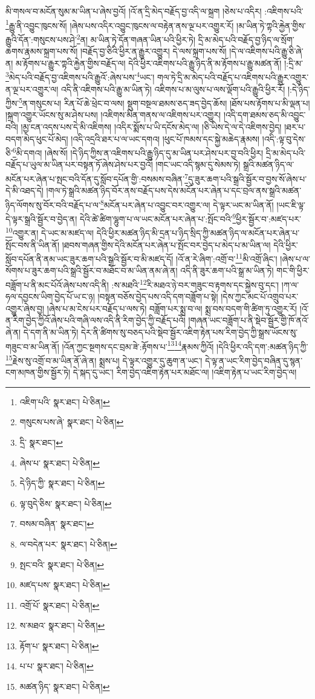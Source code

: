 མི་གསལ་བ་མངོན་སུམ་མ་ཡིན་པ་ཞེས་བྱའོ། །འོ་ན་དྲི་མེད་བརྗོད་བྱ་འདི་ལ་སྐྲག །ཅེས་པ་འདིར། :འཇིགས་པའི་\footnote{འཇིག་པའི་  སྣར་ཐང་།  པེ་ཅིན། }རྒྱུ་ནི་འབྱུང་ཁུངས་སོ། །ཞེས་པས་འདིར་འབྱུང་ཁུངས་ལ་བརྟེན་ནས་ལྔ་པར་འགྱུར་རོ། །མ་ཡིན་ཏེ་ཀྟའི་རྐྱེན་གྱིས་རྒྱུའི་དོན་:གསུངས་པས་ཤེ་\footnote{གསུངས་པས་ཞེ་  སྣར་ཐང་།  པེ་ཅིན། }ན། མ་ཡིན་ཏེ་དོན་གཞན་ཡིན་པའི་ཕྱིར་ཏེ། དྲི་མ་མེད་པའི་བརྗོད་བྱ་ཉིད་ལ་སྲོག་ཆགས་རྣམས་སྐྲག་པས་སོ། །བརྗོད་བྱ་ཅིའི་ཕྱིར་ན་རྒྱུར་འགྱུར། དེ་ལས་སྐྲག་པས་སོ། །དེ་ལ་འཇིགས་པའི་རྒྱུ་ཅི་ཞེ་ན། མ་རྟོགས་པ་རྒྱུར་ཀྟའི་རྐྱེན་གྱིས་བརྗོད་ལ། དེའི་ཕྱིར་འཇིགས་པའི་རྒྱུ་ཉིད་ནི་མ་རྟོགས་པ་རྒྱུ་མཚན་ནོ། །:དྲི་མ་\footnote{དྲི་  སྣར་ཐང་། }མེད་པའི་བརྗོད་བྱ་འཇིགས་པའི་རྒྱུའོ་:ཞེས་པས་\footnote{ཞེས་པ་  སྣར་ཐང་།  པེ་ཅིན། }ཡང་། གལ་ཏེ་དྲི་མ་མེད་པའི་བརྗོད་པ་འཇིགས་པའི་རྒྱུར་འགྱུར་ན་ལྔ་པར་འགྱུར་ལ། འདི་ནི་འཇིགས་པའི་རྒྱུ་མ་ཡིན་ཏེ། འཇིགས་པ་མ་ལུས་པ་ལས་ལྡོག་པའི་རྒྱུའི་ཕྱིར་རོ། །:དེ་ཉིད་ཀྱིས་\footnote{དེ་ཉིད་ཀྱི་  སྣར་ཐང་།  པེ་ཅིན། }ན་གསུངས་པ། རིན་པོ་ཆེ་ཕྲེང་བ་ལས། སྡུག་བསྔལ་ཐམས་ཅད་ཟད་བྱེད་ཆོས། །ཐོས་པས་རྟོགས་པ་མི་ལྡན་པ། །སྐྲག་འགྱུར་ཡོངས་སུ་མ་ཤེས་པས། །འཇིགས་མིན་གནས་ལ་འཇིགས་པར་འགྱུར། །འདི་དག་ཐམས་ཅད་མི་འབྱུང་བའི། །མྱ་ངན་འདས་པས་དེ་མི་འཇིགས། །འདིར་སྨོས་པ་ཡི་དངོས་མེད་ལ། །ཅི་ཡིས་དེ་ལ་དེ་འཇིགས་བྱེད། །ཐར་པ་བདག་མེད་ཕུང་པོ་མེད། །འདི་འདྲའི་ཐར་པ་ལ་ཡང་དགའ། །ཕུང་པོ་ཁམས་དང་སྐྱེ་མཆེད་རྣམས། །འདི་:ལྟ་བུ་དེས་ཅི་\footnote{ལྟ་བུདེ་ཅིས་  སྣར་ཐང་།  པེ་ཅིན། }མི་དགའ། །ཞེས་སོ། །དེ་ཉིད་ཀྱིས་ན་འཇིགས་པའི་རྒྱུ་ཉིད་དུ་མ་ཡིན་པར་ཤེས་པར་བྱ་བའི་ཕྱིར། དྲི་མ་མེད་པའི་བརྗོད་པ་ཡུལ་མ་ཡིན་པར་བསྟན་ཏོ་ཞེས་ཤེས་པར་བྱའོ། །གང་ཡང་འདི་སྙམ་དུ་སེམས་ཏེ། སྒྲའི་མཚན་ཉིད་ལ་མངོན་པར་ཞེན་པ་སྤང་བའི་དོན་དུ་སློབ་དཔོན་གྱི་:བསམས་བཞིན་\footnote{བསམ་བཞིན་  སྣར་ཐང་། }དུ་ཟུར་ཆག་པའི་སྒྲའི་སྦྱོར་བ་བྱས་སོ་ཞེས་པ་དེ་མི་འཐད་དེ། །གལ་ཏེ་སྒྲའི་མཚན་ཉིད་བོར་ནས་བརྗོད་པས་དེས་མངོན་པར་ཞེན་པ་དང་བྲལ་ནས་སྒྲའི་མཚན་ཉིད་ལོགས་སུ་བོར་བའི་བརྗོད་པ་ལ་\footnote{ལ་བདེན་པར་  སྣར་ཐང་།  པེ་ཅིན། }མངོན་པར་ཞེན་པ་འབྱུང་བར་འགྱུར་ལ། དེ་ལྟར་ཡང་མ་ཡིན་ནོ། །ཡང་ཇི་ལྟ་དེ་ལྟར་སྒྲའི་སྦྱོར་བ་བྱེད་ན། དེའི་ཚེ་ཚིག་ལྷུག་པ་ལ་ཡང་མངོན་པར་ཞེན་པ་:སྤོང་བའི་\footnote{སྤང་བའི་  སྣར་ཐང་།  པེ་ཅིན། }ཕྱིར་སྦྱོར་བ་:མཛད་པར་\footnote{མཛད་པས་  སྣར་ཐང་།  པེ་ཅིན། }འགྱུར་ན། དེ་ཡང་མ་མཛད་ལ། དེའི་ཕྱིར་མཚན་ཉིད་མི་དྲན་པ་ཉིད་སྲིད་ཀྱི་མཚན་ཉིད་ལ་མངོན་པར་ཞེན་པ་སྤོང་བས་ནི་ཡིན་ནོ། །ཐབས་གཞན་གྱིས་དེའི་མངོན་པར་ཞེན་པ་སྤོང་བར་བྱེད་པ་མེད་པ་མ་ཡིན་ལ། དེའི་ཕྱིར་སློབ་དཔོན་ནི་ནམ་ཡང་ཟུར་ཆག་པའི་སྒྲའི་སྦྱོར་བ་མི་མཛད་དོ། །འོ་ན་རེ་ཞིག་:འགྲོ་བ་\footnote{འགྲོ་པོ་  སྣར་ཐང་།  པེ་ཅིན། }མི་འགྲོ་ཞིང་། །ཞེས་པ་ལ་སོགས་པ་ཟུར་ཆག་པའི་སྒྲའི་སྦྱོར་བ་མཐོང་བ་མ་ཡིན་ནམ་ཞེ་ན། འདི་ནི་ཟུར་ཆག་པའི་སྒྲ་མ་ཡིན་ཏེ། གང་གི་ཕྱིར་བཟློག་པ་ནི་མང་པོའོ་ཞེས་པས་འདི་ནི། :ས་མཐའི་\footnote{ས་མཐའ་  སྣར་ཐང་།  པེ་ཅིན། }རི་མཐའ་ཉེ་བར་གཟུང་བ་རྟགས་དང་སྐྱེས་བུ་དང་། །ཀ་ལ་ཧལ་དབྱངས་ཡིག་བྱེད་པོ་ཡ་ང་ཉ། །བསྟན་བཅོས་བྱེད་པས་འདི་དག་བཟློག་པ་སྟེ། །དེས་ཀྱང་མང་པོ་འགྲུབ་པར་འགྱུར་ཞེས་བྱ། །ཞེས་པ་མ་ངེས་པར་བརྗོད་པ་ལས་ཏེ། བཟློག་པར་སྨྲ་བ་ལ། སྨྲ་བས་བདག་གི་ཚིག་ཏུ་འགྱུར་རོ། །འོ་ན་རིག་བྱེད་ཀྱིའོ་ཞེས་པའི་གཞི་ལས་འདི་ནི་རིག་བྱེད་ཀྱི་བརྗོད་པའོ། །གཞན་ཡང་བཟློག་པ་ནི་སྡེབ་སྦྱོར་གྱི་ཁོ་ནའོ་ཞེ་ན། དེ་དག་ནི་མ་ཡིན་ཏེ། དེར་ནི་ཚིགས་སུ་བཅད་པའི་སྡེབ་སྦྱོར་འཇིག་རྟེན་པས་རིག་བྱེད་ཀྱི་སྒྲས་ཡོངས་སུ་གཟུང་བ་མ་ཡིན་ནོ། །འོན་ཀྱང་སྔགས་དང་བྲམ་ཟེ་:རྟོགས་པ་\footnote{རྟོག་པ་  སྣར་ཐང་།  པེ་ཅིན། }\footnote{པ་པ་  སྣར་ཐང་།  པེ་ཅིན། }རྣམས་ཀྱིའོ། །དེའི་ཕྱིར་འདི་དག་:མཚན་ཉིད་ཀྱི་\footnote{མཚན་ཉིད་  སྣར་ཐང་།  པེ་ཅིན། }རྗེས་སུ་འགྲོ་བ་མ་ཡིན་ནོ་ཞེ་ན། སྨྲས་པ། དེ་ལྟར་འགྱུར་དུ་ཆུག་ན་ཡང་། དེ་ལྟ་ན་ཡང་རིག་བྱེད་བཞིན་དུ་སྙན་ངག་མཁན་གྱིས་སྦྱོར་ཏེ། དེ་སྐད་དུ་ཡང་། རིག་བྱེད་འཇིག་རྟེན་པར་མཐོང་ལ། །འཇིག་རྟེན་པ་ཡང་རིག་བྱེད་ལ། 